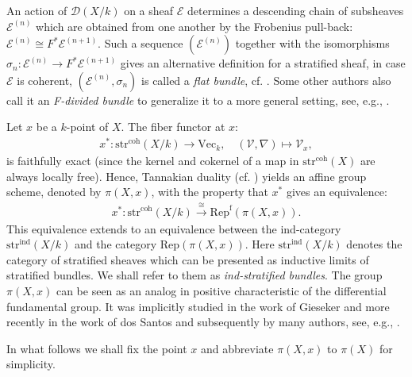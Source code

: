 \documentclass[12pt,a4]{amsart}
\theoremstyle{definition}
\begin{document}
An action of $\mathcal D (X/k)$ on a sheaf $\mathcal E$ 
determines a descending chain of subsheaves $\mathcal E^{(n)}$ which are obtained
from one another by the Frobenius pull-back: $\mathcal E^{(n)}\cong
F^*\mathcal E^{(n+1)}$. Such a sequence $(\mathcal E^{(n)})$ together with
the isomorphisms $\sigma_n:\mathcal E^{(n)}\longrightarrow
F^*\mathcal E^{(n+1)}$ gives an alternative definition
for a stratified sheaf, in case $\mathcal E$ is coherent, 
\((\mathcal E^{(n)},\sigma_n)\) is called a \textit{flat bundle}, cf.  \cite[Section~1]{Gie75}. 
Some other authors also call it an \textit{F-divided  bundle} to generalize it to a more general
setting, see, e.g., \cite{BHdS23}.

Let $x$ be a $k$-point of $X$. The fiber functor at $x:$  
\begin{align*}
 x^*:   \mathrm{str}^\mathrm{coh}(X/k) \longrightarrow \mathrm{Vec}_k,\quad 
    (\mathcal{V}, \nabla) \mapsto \mathcal{V}_{x},
\end{align*}
is faithfully exact (since the kernel and cokernel of a map in $\mathrm{str}^\mathrm{coh}(X)$
are always locally free). Hence,
Tannakian duality (cf. \cite[Theorem 2.11]{DM82})  yields an affine group
scheme, denoted by $\pi(X,x)$, with the property that $x^*$ gives an equivalence:
\begin{align}\label{eq_tannakian_equiv}
 x^*:   \mathrm{str}^\mathrm{coh}(X/k) \overset{\cong}{\longrightarrow} 
 \mathrm{Rep}^\mathrm{f}(\pi(X,x)).
\end{align} 
This equivalence extends to an equivalence between the ind-category 
$\mathrm{str}^\mathrm{ind}(X/k)$ and the category $\mathrm{Rep}(\pi(X,x))$.
Here  $\mathrm{str}^\mathrm{ind}(X/k)$ denotes the category of stratified sheaves
which can be presented as inductive limits of stratified bundles. We shall refer to
them as \textit{ind-stratified bundles}. The group $\pi(X,x)$ can be seen
as an analog in positive characteristic of the differential fundamental group. It was 
implicitly studied in the work  \cite{Gie75} of Gieseker and more recently in the work
of dos Santos \cite{dSa07} and subsequently by many authors, see, e.g., 
\cite{EM10, Kin15,ESB16,vdP19, Sun19}. 

In what follows we shall fix the point $x$
and abbreviate $\pi(X,x)$ to $\pi(X)$ for simplicity. 
\end{document}
